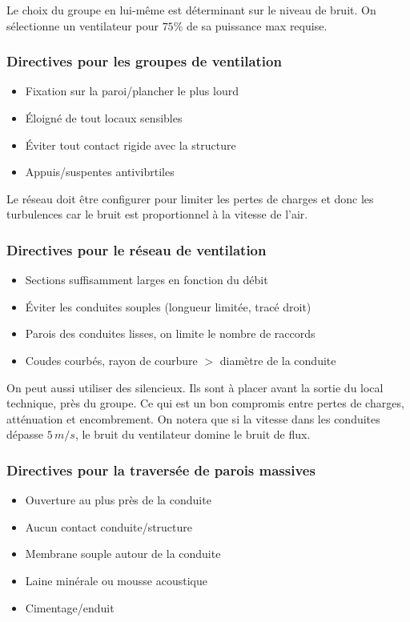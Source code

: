\documentclass[11pt]{report}
\begin{document}
Le choix du groupe en lui-même est déterminant sur le niveau de bruit. On sélectionne un ventilateur pour $75\%$ de sa puissance max requise.\\

\subsubsection{Directives pour les groupes de ventilation}
\begin{itemize}
\item Fixation sur la paroi/plancher le plus lourd
\item Éloigné de tout locaux sensibles
\item Éviter tout contact rigide avec la structure 
\item Appuis/suspentes antivibrtiles
\end{itemize}


Le réseau doit être configurer pour limiter les pertes de charges et donc les turbulences car le bruit est proportionnel à la vitesse de l'air.


\subsubsection{Directives pour le réseau de ventilation}
\begin{itemize}
\item Sections suffisamment larges en fonction du débit
\item Éviter les conduites souples (longueur limitée, tracé droit)
\item Parois des conduites lisses, on limite le nombre de raccords
\item Coudes courbés, rayon de courbure $>$ diamètre de la conduite
\end{itemize}


On peut aussi utiliser des silencieux. Ils sont à placer avant la sortie du local technique, près du groupe. Ce qui est un bon compromis entre pertes de charges, atténuation et encombrement. On notera que si la vitesse dans les conduites dépasse $5\,m/s$, le bruit du ventilateur domine le bruit de flux.\\


\subsubsection{Directives pour la traversée de parois massives}
\begin{itemize}
\item Ouverture au plus près de la conduite
\item Aucun contact conduite/structure
\item Membrane souple autour de la conduite
\item Laine minérale ou mousse acoustique
\item Cimentage/enduit
\end{itemize}
\end{document}

